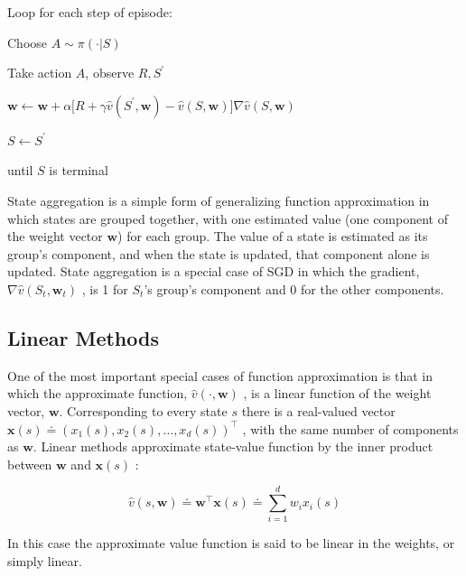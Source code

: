 \documentclass{article}
\begin{document}
\hspace{.5cm} Loop for each step of episode:

\hspace{1cm} Choose $A \sim \pi ( \cdot | S )$

\hspace{1cm} Take action $A$, observe $R , S ^ { \prime }$

\hspace{1cm} $\mathbf { w } \leftarrow \mathbf { w } + \alpha \big [ R + \gamma \hat { v } ( S ^ { \prime } \mathbf { , } \mathbf { w } ) - \hat { v } ( S \mathbf { , } \mathbf { w } ) \big ] \nabla \hat { v } ( S \mathbf { , } \mathbf { w } )$

\hspace{1cm} $S \leftarrow S ^ { \prime }$

\hspace{.5cm} until $S$ is terminal

State aggregation is a simple form of generalizing function approximation in which states are grouped together, with one estimated value (one component of the weight vector $\mathbf{w}$) for each group. 
The value of a state is estimated as its group's component, and when the state is updated, that component alone is updated. State aggregation is a special case of SGD in which the gradient, 
$\nabla \hat { v } ( S _ { t } ,   \mathbf { w } _ { t } )$ , is 1 for $S _ { t }$'s group's component and 0 for the other components.

\subsection{Linear Methods}

One of the most important special cases of function approximation is that in which the approximate function, $\hat { v } ( \cdot , \mathbf { w } )$ , is a linear function of the weight vector, $\mathbf{w}$. 
Corresponding to every state $s$ there is a real-valued vector $\mathbf { x } ( s ) \doteq ( x _ { 1 } ( s ) , x _ { 2 } ( s ) , \ldots , x _ { d } ( s ) ) ^ { \top }$ , 
with the same number of components as $\mathbf { w }$. Linear methods approximate state-value function by the inner product between $\mathbf { w }$ and $\mathbf { x } ( s )$ :

$$
\hat { v } ( s \mathbf { , } \mathbf { w } ) \doteq \mathbf { w } ^ { \top } \mathbf { x } ( s ) \doteq \sum _ { i = 1 } ^ { d } w _ { i } x _ { i } ( s )
$$

In this case the approximate value function is said to be linear in the weights, or simply linear.
\end{document}
